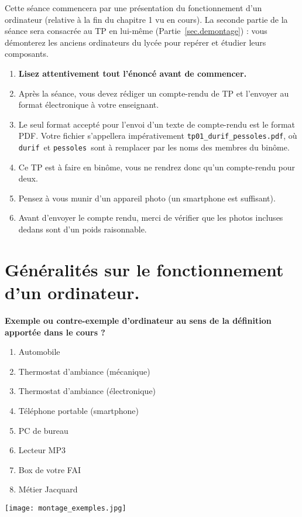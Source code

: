Cette séance commencera par une présentation du fonctionnement d'un ordinateur (relative à la fin du chapitre 1 vu en cours). 
La seconde partie de la séance sera consacrée au TP en lui-même (Partie~\ref{sec.demontage}) : vous 
démonterez les anciens ordinateurs du lycée pour repérer et étudier leurs composants. 

\begin{enumerate}
\item  \textbf{Lisez attentivement  tout l'énoncé
    avant de commencer.}
\item Après la séance, vous devez rédiger un compte-rendu de TP et
l'envoyer au format électronique à votre enseignant.
\item Le seul format accepté pour l'envoi d'un texte de compte-rendu est le
format PDF. Votre fichier s'appellera impérativement \texttt{tp01\_durif\_pessoles.pdf}, où \og \texttt{durif}\fg\ et \og \texttt{pessoles}\fg\ sont à remplacer par les noms des membres du binôme. 
\item Ce TP est à faire en binôme, vous ne rendrez donc qu'un
  compte-rendu pour deux.
\item Pensez à vous munir d'un appareil photo (un smartphone est suffisant).
\item Avant d'envoyer le compte rendu, merci de vérifier que les photos incluses dedans sont d'un poids raisonnable.
\end{enumerate}

\section{Généralités sur le fonctionnement d'un ordinateur.}\label{sec.ordi}



\begin{exemple}[]
\textbf{Exemple ou contre-exemple d'ordinateur au sens de la définition apportée dans le cours ?}

\begin{minipage}{0.4\textwidth}
\begin{enumerate}
\item Automobile
\item Thermostat d'ambiance (mécanique)
\item Thermostat d'ambiance (électronique)
\item Téléphone portable (smartphone)
\item PC de bureau
\item Lecteur MP3
\item Box de votre FAI
\item Métier Jacquard
\end{enumerate}

\end{minipage}
\begin{minipage}{0.5\textwidth}
\begin{center}
\texttt{[image: montage\_exemples.jpg]}
\end{center}
\end{minipage}
\end{exemple}


